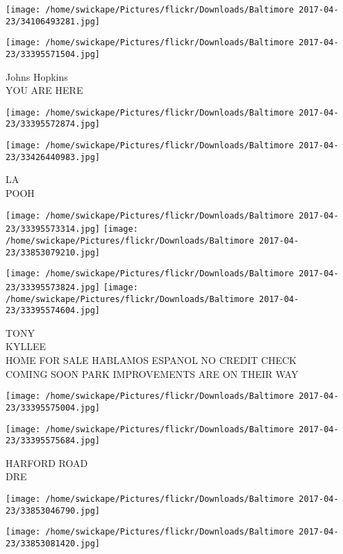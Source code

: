 \documentclass[10pt,letterpaper]{article}
\begin{document}
\texttt{[image: /home/swickape/Pictures/flickr/Downloads/Baltimore 2017-04-23/34106493281.jpg]}

\vspace{0.25in}
\texttt{[image: /home/swickape/Pictures/flickr/Downloads/Baltimore 2017-04-23/33395571504.jpg]}

Johns Hopkins\\
YOU ARE HERE\\
\pagebreak

\texttt{[image: /home/swickape/Pictures/flickr/Downloads/Baltimore 2017-04-23/33395572874.jpg]}

\vspace{0.25in}
\texttt{[image: /home/swickape/Pictures/flickr/Downloads/Baltimore 2017-04-23/33426440983.jpg]}

LA\\
POOH\\
\pagebreak

\texttt{[image: /home/swickape/Pictures/flickr/Downloads/Baltimore 2017-04-23/33395573314.jpg]}
\texttt{[image: /home/swickape/Pictures/flickr/Downloads/Baltimore 2017-04-23/33853079210.jpg]}

\texttt{[image: /home/swickape/Pictures/flickr/Downloads/Baltimore 2017-04-23/33395573824.jpg]}
\texttt{[image: /home/swickape/Pictures/flickr/Downloads/Baltimore 2017-04-23/33395574604.jpg]}

TONY\\
KYLLEE\\
HOME FOR SALE HABLAMOS ESPANOL NO CREDIT CHECK\\
COMING SOON PARK IMPROVEMENTS ARE ON THEIR WAY\\
\pagebreak

\texttt{[image: /home/swickape/Pictures/flickr/Downloads/Baltimore 2017-04-23/33395575004.jpg]}

\vspace{0.25in}
\texttt{[image: /home/swickape/Pictures/flickr/Downloads/Baltimore 2017-04-23/33395575684.jpg]}

HARFORD ROAD\\
DRE\\
\pagebreak

\texttt{[image: /home/swickape/Pictures/flickr/Downloads/Baltimore 2017-04-23/33853046790.jpg]}

\vspace{0.25in}
\texttt{[image: /home/swickape/Pictures/flickr/Downloads/Baltimore 2017-04-23/33853081420.jpg]}
\end{document}
